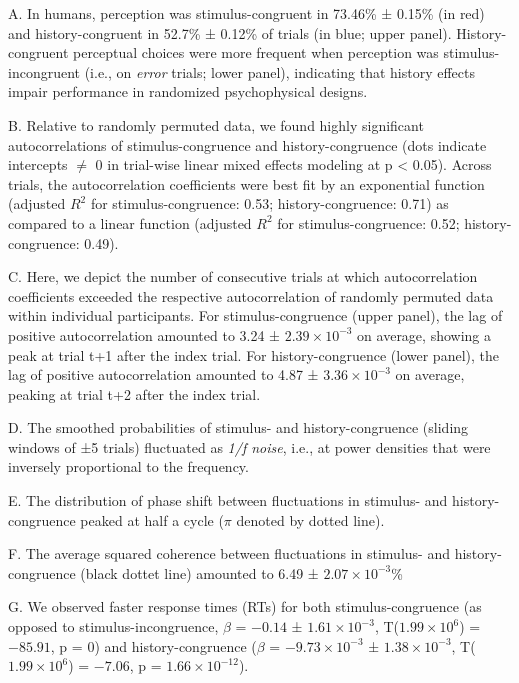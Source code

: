 \documentclass[
]{article}
\begin{document}
A. In humans, perception was stimulus-congruent in 73.46\% ± 0.15\% (in
red) and history-congruent in 52.7\% ± 0.12\% of trials (in blue; upper
panel). History-congruent perceptual choices were more frequent when
perception was stimulus-incongruent (i.e., on \emph{error} trials; lower
panel), indicating that history effects impair performance in randomized
psychophysical designs.

B. Relative to randomly permuted data, we found highly significant
autocorrelations of stimulus-congruence and history-congruence (dots
indicate intercepts \(\neq\) 0 in trial-wise linear mixed effects
modeling at p \textless{} 0.05). Across trials, the autocorrelation
coefficients were best fit by an exponential function (adjusted \(R^2\)
for stimulus-congruence: 0.53; history-congruence: 0.71) as compared to
a linear function (adjusted \(R^2\) for stimulus-congruence: 0.52;
history-congruence: 0.49).

C. Here, we depict the number of consecutive trials at which
autocorrelation coefficients exceeded the respective autocorrelation of
randomly permuted data within individual participants. For
stimulus-congruence (upper panel), the lag of positive autocorrelation
amounted to 3.24 ± \ensuremath{2.39\times 10^{-3}} on average, showing a
peak at trial t+1 after the index trial. For history-congruence (lower
panel), the lag of positive autocorrelation amounted to 4.87 ±
\ensuremath{3.36\times 10^{-3}} on average, peaking at trial t+2 after
the index trial.

D. The smoothed probabilities of stimulus- and history-congruence
(sliding windows of ±5 trials) fluctuated as \emph{1/f noise}, i.e., at
power densities that were inversely proportional to the frequency.

E. The distribution of phase shift between fluctuations in stimulus- and
history-congruence peaked at half a cycle (\(\pi\) denoted by dotted
line).

F. The average squared coherence between fluctuations in stimulus- and
history-congruence (black dottet line) amounted to 6.49 ±
\ensuremath{2.07\times 10^{-3}}\%

G. We observed faster response times (RTs) for both stimulus-congruence
(as opposed to stimulus-incongruence, \(\beta\) = \(-0.14\) ±
\(\ensuremath{1.61\times 10^{-3}}\),
T(\(\ensuremath{1.99\times 10^{6}}\)) = \(-85.91\), p = \(0\)) and
history-congruence (\(\beta\) = \(\ensuremath{-9.73\times 10^{-3}}\) ±
\(\ensuremath{1.38\times 10^{-3}}\),
T(\(\ensuremath{1.99\times 10^{6}}\)) = \(-7.06\), p =
\(\ensuremath{1.66\times 10^{-12}}\)).
\end{document}
